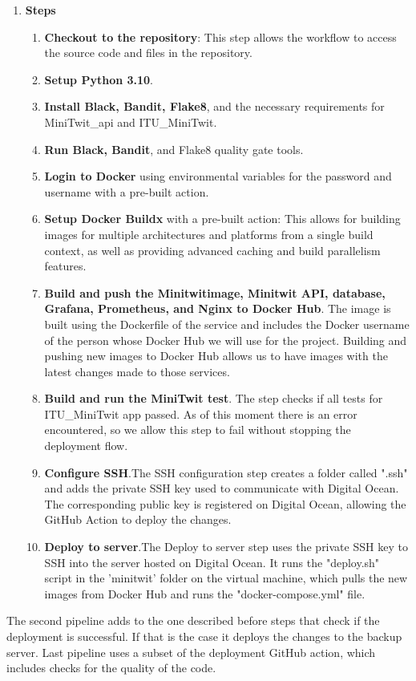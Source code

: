 \documentclass{article}
\begin{document}
\begin{enumerate}
\begin{enumerate}
\item \textbf{Steps}
\begin{enumerate}
    \item \textbf{Checkout to the repository}: This step allows the workflow to access the source code and files in the repository.
    \item \textbf{Setup Python 3.10}.
    \item \textbf{Install Black, Bandit, Flake8}, and the necessary requirements for MiniTwit\_api and ITU\_MiniTwit.
    \item \textbf{Run Black, Bandit}, and Flake8 quality gate tools.
    \item \textbf{Login to Docker} using environmental variables for the password and username with a pre-built action.
    \item \textbf{Setup Docker Buildx} with a pre-built action: This allows for building images for multiple architectures and platforms from a single build context, as well as providing advanced caching and build parallelism features.
    \item \textbf{Build and push the Minitwitimage, Minitwit API, database, Grafana, Prometheus, and Nginx to Docker Hub}. The image is built using the Dockerfile of the service and includes the Docker username of the person whose Docker Hub we will use for the project. Building and pushing new images to Docker Hub allows us to have images with the latest changes made to those services.
    \item \textbf{Build and run the MiniTwit test}. The step checks if all tests for ITU\_MiniTwit app passed. As of this moment there is an error encountered, so we allow this step to fail without stopping the deployment flow.
    \item \textbf{Configure SSH}.The SSH configuration step creates a folder called ".ssh" and adds the private SSH key used to communicate with Digital Ocean. The corresponding public key is registered on Digital Ocean, allowing the GitHub Action to deploy the changes.
    \item \textbf{Deploy to server}.The Deploy to server step uses the private SSH key to SSH into the server hosted on Digital Ocean. It runs the "deploy.sh" script in the 'minitwit' folder on the virtual machine, which pulls the new images from Docker Hub and runs the "docker-compose.yml" file.
\end{enumerate}
\end{enumerate}
\end{enumerate}
The second pipeline adds to the one described before steps that check if the deployment is successful. If that is the case it deploys the changes to the backup server. Last pipeline uses a subset of the deployment GitHub action, which includes checks for the quality of the code.
\end{document}
